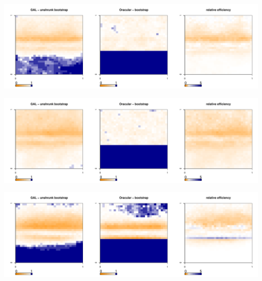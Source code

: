 \documentclass[authoryear, review, 11pt]{elsarticle}
\begin{document}
	\begin{center}
		\includegraphics[width=0.99\textwidth]{../../figures/X1-28-14.pdf}
		\label{fig:coveragemap14}
	\end{center}
	
	\begin{center}
		\includegraphics[width=0.99\textwidth]{../../figures/X1-28-15.pdf}
		\label{fig:coveragemap15}
	\end{center}
	
	\begin{center}
		\includegraphics[width=0.99\textwidth]{../../figures/X1-28-16.pdf}
		\label{fig:coveragemap16}
	\end{center}
        
\end{document}
